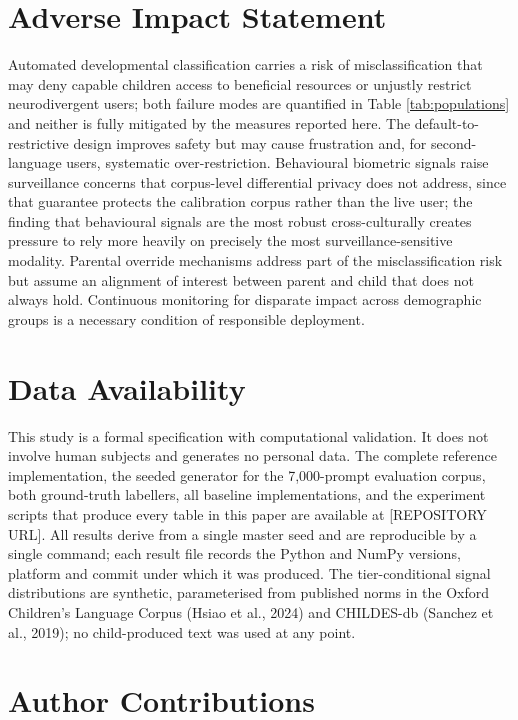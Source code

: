 \documentclass[fleqn,10pt]{wlscirep}
\begin{document}
\section*{Adverse Impact Statement}

Automated developmental classification carries a risk of misclassification that may deny capable children access to beneficial resources or unjustly restrict neurodivergent users; both failure modes are quantified in Table \ref{tab:populations} and neither is fully mitigated by the measures reported here. The default-to-restrictive design improves safety but may cause frustration and, for second-language users, systematic over-restriction. Behavioural biometric signals raise surveillance concerns that corpus-level differential privacy does not address, since that guarantee protects the calibration corpus rather than the live user; the finding that behavioural signals are the most robust cross-culturally creates pressure to rely more heavily on precisely the most surveillance-sensitive modality. Parental override mechanisms address part of the misclassification risk but assume an alignment of interest between parent and child that does not always hold. Continuous monitoring for disparate impact across demographic groups is a necessary condition of responsible deployment.

\section*{Data Availability}

This study is a formal specification with computational validation. It does not involve human subjects and generates no personal data. The complete reference implementation, the seeded generator for the 7,000-prompt evaluation corpus, both ground-truth labellers, all baseline implementations, and the experiment scripts that produce every table in this paper are available at [REPOSITORY URL]. All results derive from a single master seed and are reproducible by a single command; each result file records the Python and NumPy versions, platform and commit under which it was produced. The tier-conditional signal distributions are synthetic, parameterised from published norms in the Oxford Children's Language Corpus (Hsiao et al., 2024)\cite{Hsiao2024} and CHILDES-db (Sanchez et al., 2019)\cite{Sanchez2019}; no child-produced text was used at any point.

\section*{Author Contributions}
\end{document}

